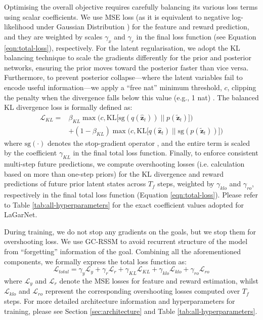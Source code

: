 \documentclass[journal]{IEEEtran}
\newcommand{\addinfo}[1]{\textcolor{myPurple}{#1}}
\begin{document}
\addinfo{Optimising the overall objective requires carefully balancing its various loss terms using scalar coefficients. We use MSE loss (as it is equivalent to negative log-likelihood under Gaussian Distribution \cite{goodfellow2016deep}) for the feature and reward prediction, and they are weighted by scales $\gamma_x$ and $\gamma_r$ in the final loss function (see Equation \ref{eqn:total-loss}), respectively. For the latent regularisation, we adopt the KL balancing technique \cite{hafner2021mastering} to scale the gradients differently for the prior and posterior networks, ensuring the prior moves toward the posterior faster than vice versa. Furthermore, to prevent posterior collapse---where the latent variables fail to encode useful information---we apply a ``free nat'' minimum threshold, $c$, clipping the penalty when the divergence falls below this value (e.g., 1 nat) \cite{hafner2019learning}. The balanced KL divergence loss is formally defined as:
\begin{equation}
\begin{aligned}
    \mathcal{L}_{KL} = &\beta_{KL} \max\Big(c, \text{KL}\big[\text{sg}(q(\hat{\bm{z}}_t)) \;\big|\big|\; p(\tilde{\bm{z}}_t)\big]\Big) \\ 
    &+ (1 - \beta_{KL}) \max\Big(c, \text{KL}\big[q(\hat{\bm{z}}_t) \;\big|\big|\; \text{sg}(p(\tilde{\bm{z}}_t))\big]\Big)
\end{aligned} \label{eqn:kl-balance}
\end{equation}
where $\text{sg}(\cdot)$ denotes the stop-gradient operator \cite{hafner2025mastering}, and the entire term is scaled by the coefficient $\gamma_{KL}$ in the final total loss function. Finally, to enforce consistent multi-step future predictions, we compute overshooting losses (i.e. calculation based on more than one-step priors) for the KL divergence and reward predictions of future prior latent states across $T_f$ steps, weighted by $\gamma_{klo}$ and $\gamma_{ro}$, respectively in the final total loss function (Equation \ref{eqn:total-loss}). Please refer to Table \ref{tab:all-hyperparameters} for the exact coefficient values adopted for LaGarNet.}

During training, we do not stop any gradients on the goals, but we stop them for overshooting loss. We use GC-RSSM to avoid recurrent structure of the model from ``forgetting'' information of the goal. \addinfo{Combining all the aforementioned components, we formally express the total loss function as:
\begin{equation}
    \mathcal{L}_{total} = \gamma_y \mathcal{L}_y + \gamma_r \mathcal{L}_r + \gamma_{KL} \mathcal{L}_{KL} + \gamma_{klo} \mathcal{L}_{klo} + \gamma_{ro} \mathcal{L}_{ro} \label{eqn:total-loss}
\end{equation}
where $\mathcal{L}_y$ and $\mathcal{L}_r$ denote the MSE losses for feature and reward estimation, whilst $\mathcal{L}_{klo}$ and $\mathcal{L}_{ro}$ represent the corresponding overshooting losses computed over $T_f$ steps. For more detailed architecture information and hyperparameters for training, please see Section \ref{sec:architecture} and Table \ref{tab:all-hyperparameters}}.
\end{document}

